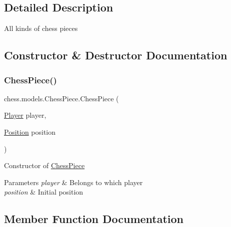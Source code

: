 \subsection{Detailed Description}
All kinds of chess pieces 

\subsection{Constructor \& Destructor Documentation}
\mbox{\label{classchess_1_1models_1_1_chess_piece_a59beae5e1f384747a201a4c417ca0afb}} 
\subsubsection{\texorpdfstring{Chess\+Piece()}{ChessPiece()}}
{\footnotesize\ttfamily chess.\+models.\+Chess\+Piece.\+Chess\+Piece (\begin{DoxyParamCaption}\item[{\mbox{\hyperlink{enumchess_1_1models_1_1enums_1_1_player}{Player}}}]{player,  }\item[{\mbox{\hyperlink{classchess_1_1models_1_1_position}{Position}}}]{position }\end{DoxyParamCaption})}

Constructor of \mbox{\hyperlink{classchess_1_1models_1_1_chess_piece}{Chess\+Piece}}


\begin{DoxyParams}{Parameters}
{\em player} & Belongs to which player \\
\hline
{\em position} & Initial position \\
\hline
\end{DoxyParams}


\subsection{Member Function Documentation}
\mbox{\label{classchess_1_1models_1_1_chess_piece_afd359313e83bdef860f9f8236435522f}} 
